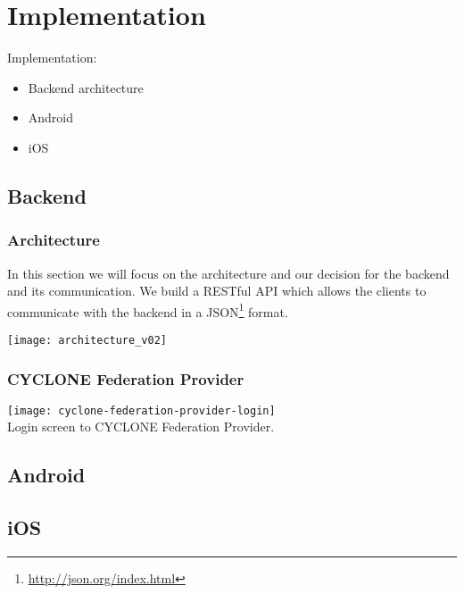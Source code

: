 \chapter{Implementation}
\label{cha:implementation}

Implementation:
\begin{itemize}
    \item Backend architecture
    \item Android
    \item iOS
\end{itemize}

\hline


\vspace{0.5cm}

\section{Backend}

\subsection{Architecture}

In this section we will focus on the architecture and our decision for the backend and its communication.
We build a RESTful API which allows the clients to communicate with the backend in a JSON\footnote{\url{http://json.org/index.html}} format. 

\begin{center}
    \texttt{[image: architecture\_v02]}\\
\end{center}

\subsection{CYCLONE Federation Provider}

\begin{center}
    \texttt{[image: cyclone-federation-provider-login]}\\
    Login screen to CYCLONE Federation Provider.
\end{center}


\vspace{0.5cm}

\section{Android}


\vspace{0.5cm}

\section{iOS}
